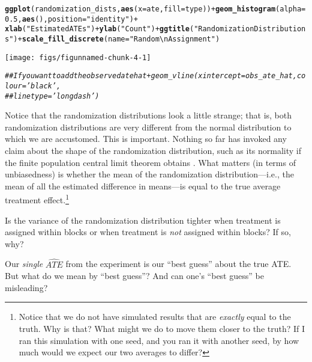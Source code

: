 \documentclass[11pt,leqno]{article}\usepackage[]{graphicx}\usepackage[]{color}
\makeatletter
\newcommand{\hlnum}[1]{\textcolor[rgb]{0.686,0.059,0.569}{#1}}%
\newcommand{\hlstr}[1]{\textcolor[rgb]{0.192,0.494,0.8}{#1}}%
\newcommand{\hlcom}[1]{\textcolor[rgb]{0.678,0.584,0.686}{\textit{#1}}}%
\newcommand{\hlopt}[1]{\textcolor[rgb]{0,0,0}{#1}}%
\newcommand{\hlstd}[1]{\textcolor[rgb]{0.345,0.345,0.345}{#1}}%
\newcommand{\hlkwc}[1]{\textcolor[rgb]{0.333,0.667,0.333}{#1}}%
\newcommand{\hlkwd}[1]{\textcolor[rgb]{0.737,0.353,0.396}{\textbf{#1}}}%
\newenvironment{kframe}{%
 \def\at@end@of@kframe{}%
 \ifinner\ifhmode%
  \def\at@end@of@kframe{\end{minipage}}%
  \begin{minipage}{\columnwidth}%
 \fi\fi%
 \def\FrameCommand##1{\hskip\@totalleftmargin \hskip-\fboxsep
 \colorbox{shadecolor}{##1}\hskip-\fboxsep
     \hskip-\linewidth \hskip-\@totalleftmargin \hskip\columnwidth}%
 \MakeFramed {\advance\hsize-\width
   \@totalleftmargin\z@ \linewidth\hsize
   \@setminipage}}%
 {\par\unskip\endMakeFramed%
 \at@end@of@kframe}
\newenvironment{knitrout}{}{} %
\theoremstyle{newstyle}
\makeatother
\begin{document}
\begin{knitrout}
\begin{kframe}
\begin{alltt}
\hlkwd{ggplot}\hlstd{(randomization_dists,} \hlkwd{aes}\hlstd{(}\hlkwc{x} \hlstd{= ate,} \hlkwc{fill} \hlstd{= type))} \hlopt{+} \hlkwd{geom_histogram}\hlstd{(}\hlkwc{alpha} \hlstd{=} \hlnum{0.5}\hlstd{,} \hlkwd{aes}\hlstd{(),} \hlkwc{position} \hlstd{=} \hlstr{"identity"}\hlstd{)} \hlopt{+}
    \hlkwd{xlab}\hlstd{(}\hlstr{"Estimated ATEs"}\hlstd{)} \hlopt{+} \hlkwd{ylab}\hlstd{(}\hlstr{"Count"}\hlstd{)} \hlopt{+} \hlkwd{ggtitle}\hlstd{(}\hlstr{"Randomization Distributions"}\hlstd{)} \hlopt{+} \hlkwd{scale_fill_discrete}\hlstd{(}\hlkwc{name} \hlstd{=} \hlstr{"Random \textbackslash{}nAssignment"}\hlstd{)}
\end{alltt}
\end{kframe}
\texttt{[image: figs/figunnamed-chunk-4-1]} 
\begin{kframe}\begin{alltt}
\hlcom{## If you want to add the observed ate hat + geom_vline(xintercept = obs_ate_hat, colour = 'black',}
\hlcom{## linetype = 'longdash')}
\end{alltt}
\end{kframe}
\end{knitrout}

Notice that the randomization distributions look a little strange; that is, both randomization distributions are very different from the normal distribution to which we are accustomed. This is important. Nothing so far has invoked any claim about the shape of the randomization distribution, such as its normality if the finite population central limit theorem obtains \citep{hajek1960}. What matters (in terms of unbiasedness) is whether the mean of the randomization distribution---i.e., the mean of all the estimated
difference in means---is equal to the true average treatment effect.\footnote{Notice that we do not have simulated results that are \emph{exactly}	equal to the truth. Why is that? What might we do to move them closer to the truth? If I ran this simulation with one seed, and you ran it with another seed, by how much would we expect our two averages to	differ?}

Is the variance of the randomization distribution tighter when treatment is assigned within blocks or when treatment is \textit{not} assigned within blocks? If so, why?

Our \textit{single} $\widehat{ATE}$ from the experiment is our ``best guess'' about the true ATE. But what do we mean by ``best guess''? And can one's ``best guess'' be misleading?
\end{document}
